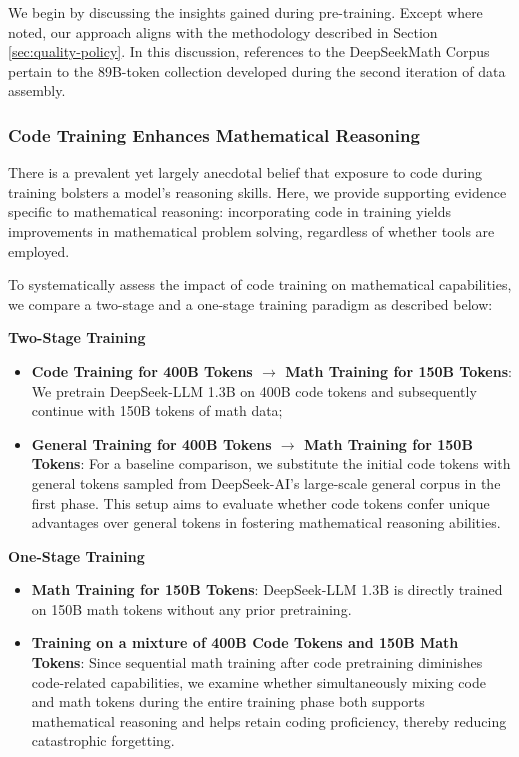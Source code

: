 We begin by discussing the insights gained during pre-training. Except where noted, our approach aligns with the methodology described in Section \ref{sec:quality-policy}. In this discussion, references to the DeepSeekMath Corpus pertain to the 89B-token collection developed during the second iteration of data assembly.

\subsubsection{Code Training Enhances Mathematical Reasoning}

There is a prevalent yet largely anecdotal belief that exposure to code during training bolsters a model's reasoning skills. Here, we provide supporting evidence specific to mathematical reasoning: incorporating code in training yields improvements in mathematical problem solving, regardless of whether tools are employed.

To systematically assess the impact of code training on mathematical capabilities, we compare a two-stage and a one-stage training paradigm as described below:

\textbf{Two-Stage Training}

\begin{itemize}[topsep=0pt]
    \item \textbf{Code Training for 400B Tokens $\rightarrow$ Math Training for 150B Tokens}: We pretrain DeepSeek-LLM 1.3B on 400B code tokens and subsequently continue with 150B tokens of math data;
    \item \textbf{General Training for 400B Tokens $\rightarrow$ Math Training for 150B Tokens}: For a baseline comparison, we substitute the initial code tokens with general tokens sampled from DeepSeek-AI's large-scale general corpus in the first phase. This setup aims to evaluate whether code tokens confer unique advantages over general tokens in fostering mathematical reasoning abilities.
\end{itemize}

\textbf{One-Stage Training}

\begin{itemize}[topsep=0pt]
    \item \textbf{Math Training for 150B Tokens}: DeepSeek-LLM 1.3B is directly trained on 150B math tokens without any prior pretraining.
    \item \textbf{Training on a mixture of 400B Code Tokens and 150B Math Tokens}: Since sequential math training after code pretraining diminishes code-related capabilities, we examine whether simultaneously mixing code and math tokens during the entire training phase both supports mathematical reasoning and helps retain coding proficiency, thereby reducing catastrophic forgetting.
\end{itemize}

